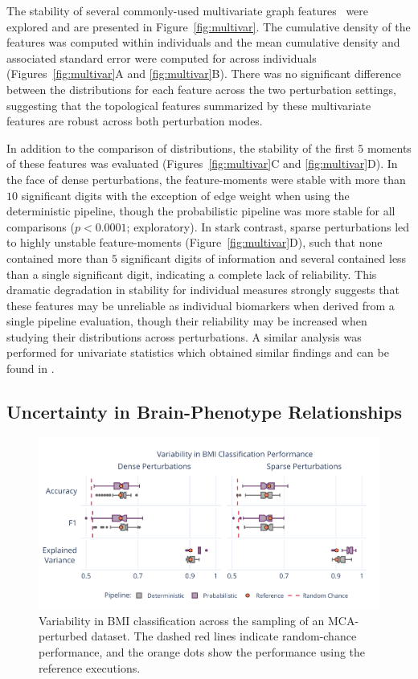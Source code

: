 \documentclass[fleqn,10pt]{SelfArx} %
\newcommand{\new}[1]{{\color{blue} #1}}
\begin{document}
The stability of several commonly-used multivariate graph features~\cite{Betzel2018-eo} \new{were} explored \new{and
are presented} in Figure~\ref{fig:multivar}. The cumulative density of the features was computed within individuals and
the mean \new{cumulative} density and associated standard error were computed for across individuals
(Figures~\ref{fig:multivar}A and \ref{fig:multivar}B). There was no significant difference between the distributions
for each feature across the two perturbation settings, suggesting that the topological features summarized by these
multivariate features are robust across both perturbation modes.

In addition to the comparison of distributions, the stability of the first $5$ moments of these features was evaluated
(Figures~\ref{fig:multivar}C and \ref{fig:multivar}D). In the face of \new{dense} perturbations, the feature-moments
were stable with more than $10$ significant digits with the exception of edge weight when using the deterministic
pipeline, though the probabilistic pipeline was more stable for all comparisons ($p < 0.0001$; exploratory). In stark
contrast, \new{sparse} perturbations led to highly unstable feature-moments (Figure~\ref{fig:multivar}D), such that
none contained more than $5$ significant digits of information and several contained less than a single significant
digit, indicating a complete lack of reliability. This dramatic degradation in stability for individual measures
strongly suggests that these features may be unreliable as individual biomarkers when derived from a single pipeline
evaluation, though their reliability may be increased when studying their distributions across perturbations. A similar
analysis was performed for univariate statistics \new{which obtained similar findings} and can be found in
.

\subsection*{Uncertainty in Brain-Phenotype Relationships}

\begin{figure}[ht]\centering
\includegraphics[width=0.7\linewidth]{figures/fig3_bmi_classification.pdf}
\caption{Variability in BMI classification across the sampling of an MCA-perturbed dataset. The dashed red lines
indicate random-chance performance, and the orange dots show the performance using the reference executions.}
\label{fig:bmi}
\end{figure}
 
\end{document}
